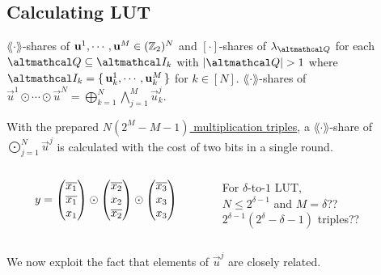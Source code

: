 \documentclass[../240906_cryptlab_flute.tex]{subfiles}
\begin{document}
\subsection{Calculating LUT}
\begin{frame}{}
    \begin{exampleblock}{}
        \begin{description}[Output]
            \ii[Input]
            \(\lang\cdot\rang\)-shares of \(\boldsymbol{\mathbf{u}}^1, \cdots, \boldsymbol{\mathbf{u}}^M \in (\mathbb{Z}_2)^N\) and
            \([\cdot]\)-shares of \(\lambda_{\mcal{Q}}\) for each \(\mcal{Q} \subseteq \mcal{I}_k\)
            with \(|\mcal{Q}| > 1\) where \(\mcal{I}_k = \{\,\vec{u}^1_k,\cdots,\vec{u}^M_k\,\}\)
            for \(k \in [N]\).
            \ii[Output]
            \(\lang\cdot\rang\)-shares of
            \(\vec{u}^1 \odot \cdots \odot \vec{u}^N = \bigoplus_{k=1}^N \bigwedge_{j=1}^M \vec{u}^j_k\).
        \end{description}
        With the prepared \ul{\(N(2^M - M - 1)\) multiplication triples},
        a \(\lang\cdot\rang\)-share of \(\bigodot_{j=1}^N \vec{u}^j\)
        is calculated with the cost of two bits in a single round.
    \end{exampleblock}

    \pause
    \begin{columns}
        \begin{column}{.5\textwidth}
            \begin{equation*}
                y
                = \begin{pmatrix} \overline{x_1} \\ \overline{x_1} \\ x_1 \end{pmatrix}
                   \odot \begin{pmatrix} \overline{x_2} \\ x_2 \\ \overline{x_2} \end{pmatrix}
                   \odot \begin{pmatrix} \overline{x_3} \\ x_3 \\ x_3 \end{pmatrix}
            \end{equation*}
        \end{column}
        \begin{column}{.5\textwidth}
            \centering
            For \(\delta\)-to-\(1\) LUT, \\
            \(N \le 2^{\delta - 1}\) and \(M = \delta\)?? \\
            \pause
            \(2^{\delta-1}(2^\delta-\delta-1)\) triples??
        \end{column}
    \end{columns}

    \pause
    \begin{alertblock}{}
        We now exploit the fact that elements of \(\vec{u}^j\) are closely related.
        \centerline{}
    \end{alertblock}
\end{frame}
\end{document}
